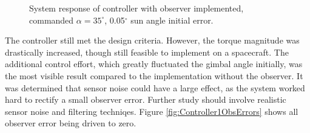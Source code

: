 \documentclass[]{aiaa-tc}%
\begin{document}
	\begin{figure}[H]
		\centering
		\caption{System response of controller with observer implemented, commanded $\alpha=35^{\circ}$, 0.05$^{\circ}$ sun angle initial error. }
		\label{fig:Controller1Obs}
	\end{figure}	

	The controller still met the design criteria. However, the torque magnitude was drastically increased, though still feasible to implement on a spacecraft. The additional control effort, which greatly fluctuated the gimbal angle initially, was the most visible result compared to the implementation without the observer. It was determined that sensor noise could have a large effect, as the system worked hard to rectify a small observer error. Further study should involve realistic sensor noise and filtering techniqes. Figure \ref{fig:Controller1ObsErrors} shows all observer error being driven to zero.
\end{document}
